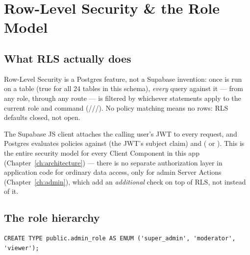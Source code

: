 \chapter{Row-Level Security \& the Role Model}
\label{ch:rls}

\section{What RLS actually does}

Row-Level Security is a Postgres feature, not a Supabase invention: once  is run on a table (true for all 24 tables in this schema), \emph{every} query against it — from any role, through any route — is filtered by whichever  statements apply to the current role and command (///). No policy matching means no rows: RLS defaults closed, not open.

The Supabase JS client attaches the calling user's JWT to every request, and Postgres evaluates policies against  (the JWT's subject claim) and  ( or ). This is the entire security model for every Client Component in this app (Chapter~\ref{ch:architecture}) — there is no separate authorization layer in application code for ordinary data access, only for admin Server Actions (Chapter~\ref{ch:admin}), which add an \emph{additional} check on top of RLS, not instead of it.

\section{The role hierarchy}

\begin{lstlisting}[style=olkcodesql, caption={The only enum in the schema}]
CREATE TYPE public.admin_role AS ENUM ('super_admin', 'moderator', 'viewer');
\end{lstlisting}

